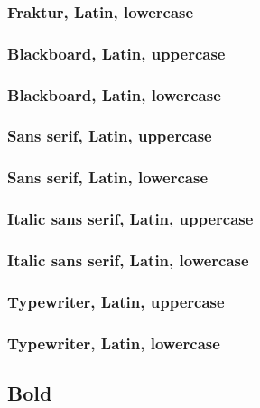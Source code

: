\documentclass[final]{article}
\newcounter{#1}
\begin{document}
\subsubsection{Fraktur, Latin, lowercase}

\subsubsection{Blackboard, Latin, uppercase}

\subsubsection{Blackboard, Latin, lowercase}

\subsubsection{Sans serif, Latin, uppercase}

\subsubsection{Sans serif, Latin, lowercase}

\subsubsection{Italic sans serif, Latin, uppercase}

\subsubsection{Italic sans serif, Latin, lowercase}

\subsubsection{Typewriter, Latin, uppercase}

\subsubsection{Typewriter, Latin, lowercase}

\subsection{Bold}
\end{document}
